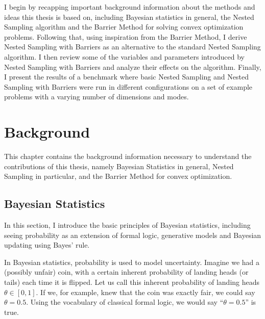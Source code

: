 \documentclass[12pt, a4paper]{report}
\begin{document}
I begin by recapping important background information about the methods and ideas this thesis is based on, including Bayesian statistics in general, the Nested Sampling algorithm and the Barrier Method for solving convex optimization problems.
Following that, using inspiration from the Barrier Method, I derive Nested Sampling with Barriers as an alternative to the standard Nested Sampling algorithm.
I then review some of the variables and parameters introduced by Nested Sampling with Barriers and analyze their effects on the algorithm.
Finally, I present the results of a benchmark where basic Nested Sampling and Nested Sampling with Barriers were run in different configurations on a set of example problems with a varying number of dimensions and modes.
\setcounter{page}{5}

\chapter{Background}
This chapter contains the background information necessary to understand the contributions of this thesis, namely Bayesian Statistics in general, Nested Sampling in particular, and the Barrier Method for convex optimization.
\section{Bayesian Statistics}
In this section, I introduce the basic principles of Bayesian statistics, including seeing probability as an extension of formal logic, generative models and Bayesian updating using Bayes' rule.

In Bayesian statistics, probability is used to model uncertainty.
Imagine we had a (possibly unfair) coin, with a certain inherent probability of landing heads (or tails) each time it is flipped.
Let us call this inherent probability of landing heads $\theta \in [0, 1]$.
If we, for example, knew that the coin was exactly fair, we could say $\theta = 0.5$.
Using the vocabulary of classical formal logic, we would say ``$\theta = 0.5$'' is true.
\end{document}
